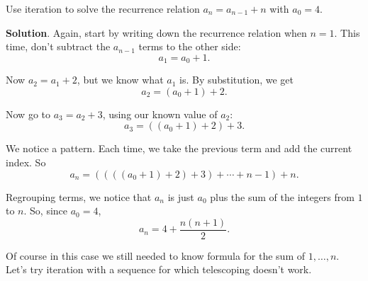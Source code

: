 \documentclass[11pt,]{book}
\theoremstyle{ptxplainnotitle}
\theoremstyle{ptxplaintitle}
\theoremstyle{ptxdefinitionnotitle}
\theoremstyle{ptxdefinitiontitle}
\theoremstyle{ptxdefinitionnotitle}
\theoremstyle{ptxdefinitiontitle}
\theoremstyle{ptxdefinitionnotitle}
\theoremstyle{ptxdefinitiontitle}
\theoremstyle{ptxdefinitiontitlenonumber}
\theoremstyle{ptxdefinitiontitlenonumber}
\numberwithin{equation}{chapter}
\begin{document}
\begin{example}\label{example-21}
\hypertarget{p-460}{}%
Use iteration to solve the recurrence relation \(a_n = a_{n-1} + n\) with \(a_0 = 4\).%
\par\smallskip%
\noindent\textbf{Solution}.\hypertarget{solution-62}{}\quad%
\hypertarget{p-461}{}%
Again, start by writing down the recurrence relation when \(n = 1\). This time, don't subtract the \(a_{n-1}\) terms to the other side:%
\begin{equation*}
a_1 = a_0 + 1.
\end{equation*}
%
\par
\hypertarget{p-462}{}%
Now \(a_2 = a_1 + 2\), but we know what \(a_1\) is. By substitution, we get%
\begin{equation*}
a_2 = (a_0 + 1) + 2.
\end{equation*}
%
\par
\hypertarget{p-463}{}%
Now go to \(a_3 = a_2 + 3\), using our known value of \(a_2\):%
\begin{equation*}
a_3 = ((a_0 + 1) + 2) + 3.
\end{equation*}
%
\par
\hypertarget{p-464}{}%
We notice a pattern. Each time, we take the previous term and add the current index. So%
\begin{equation*}
a_n = ((((a_0 + 1) +2)+3)+\cdots + n-1) + n.
\end{equation*}
%
\par
\hypertarget{p-465}{}%
Regrouping terms, we notice that \(a_n\) is just \(a_0\) plus the sum of the integers from \(1\) to \(n\). So, since \(a_0 = 4\),%
\begin{equation*}
a_n = 4 + \frac{n(n+1)}{2}.
\end{equation*}
%
\end{example}
\hypertarget{p-466}{}%
Of course in this case we still needed to know formula for the sum of \(1,\ldots,n\). Let's try iteration with a sequence for which telescoping doesn't work.%
\end{document}
